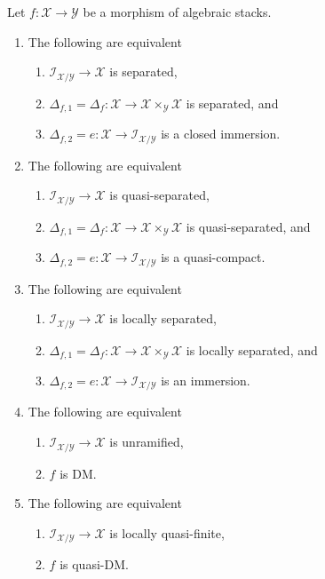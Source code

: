 \begin{lemma}
\label{lemma-diagonal-diagonal}
Let $f : \mathcal{X} \to \mathcal{Y}$ be a morphism of algebraic stacks.
\begin{enumerate}
\item
The following are equivalent
\begin{enumerate}
\item $\mathcal{I}_{\mathcal{X}/\mathcal{Y}} \to \mathcal{X}$
is separated,
\item $\Delta_{f, 1} = \Delta_f :
\mathcal{X} \to \mathcal{X} \times_\mathcal{Y} \mathcal{X}$
is separated, and
\item $\Delta_{f, 2} = e :
\mathcal{X} \to \mathcal{I}_{\mathcal{X}/\mathcal{Y}}$
is a closed immersion.
\end{enumerate}
\item
The following are equivalent
\begin{enumerate}
\item $\mathcal{I}_{\mathcal{X}/\mathcal{Y}} \to \mathcal{X}$
is quasi-separated,
\item $\Delta_{f, 1} = \Delta_f :
\mathcal{X} \to \mathcal{X} \times_\mathcal{Y} \mathcal{X}$
is quasi-separated, and
\item $\Delta_{f, 2} = e :
\mathcal{X} \to \mathcal{I}_{\mathcal{X}/\mathcal{Y}}$
is a quasi-compact.
\end{enumerate}
\item
The following are equivalent
\begin{enumerate}
\item $\mathcal{I}_{\mathcal{X}/\mathcal{Y}} \to \mathcal{X}$
is locally separated,
\item $\Delta_{f, 1} = \Delta_f :
\mathcal{X} \to \mathcal{X} \times_\mathcal{Y} \mathcal{X}$
is locally separated, and
\item $\Delta_{f, 2} = e :
\mathcal{X} \to \mathcal{I}_{\mathcal{X}/\mathcal{Y}}$
is an immersion.
\end{enumerate}
\item
The following are equivalent
\begin{enumerate}
\item $\mathcal{I}_{\mathcal{X}/\mathcal{Y}} \to \mathcal{X}$
is unramified,
\item $f$ is DM.
\end{enumerate}
\item
The following are equivalent
\begin{enumerate}
\item $\mathcal{I}_{\mathcal{X}/\mathcal{Y}} \to \mathcal{X}$
is locally quasi-finite,
\item $f$ is quasi-DM.
\end{enumerate}
\end{enumerate}
\end{lemma}

